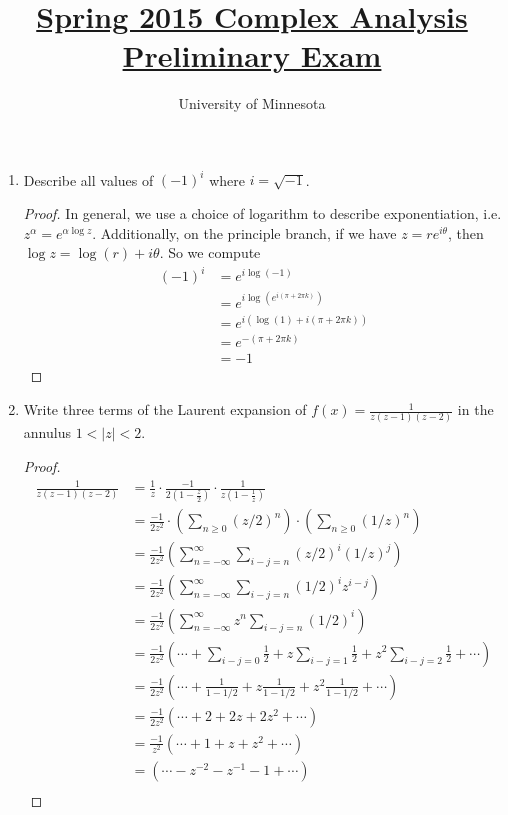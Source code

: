 \documentclass{article}
\title{\href{https://math.umn.edu/sites/math.umn.edu/files/exams/complexs15.pdf}{Spring 2015 Complex Analysis Preliminary Exam}}
\author{University of Minnesota}
\date{}
\begin{document}
\maketitle

\begin{enumerate}
	
	\item Describe all values of $(-1)^i$ where $i = \sqrt{-1}$.
	
	\begin{proof}
		In general, we use a choice of logarithm to describe exponentiation, i.e. $z^\alpha = e^{\alpha \log z}$.
		Additionally, on the principle branch, if we have $z = re^{i \theta}$, then $\log z = \log(r) + i\theta$.
		So we compute
		\begin{align*}
			(-1)^i &= e^{i \log (-1)} \\
			&= e^{i \log(e^{i (\pi + 2\pi k)})}\\
			&= e^{i (\log(1) + i (\pi + 2\pi k))}\\
			&= e^{-(\pi+2\pi k)}\\
			&= -1
		\end{align*}
	\end{proof}
	
	\item Write three terms of the Laurent expansion of $f(x) = \frac{1}{z(z-1)(z-2)}$ in the annulus $1 < |z| < 2$.
	
	\begin{proof}
	\begin{align*}
		\frac{1}{z(z-1)(z-2)}&= \frac{1}{z} \cdot \frac{-1}{2(1-\frac{z}{2})} \cdot \frac{1}{z(1-\frac{1}{z})}\\
		&= \frac{-1}{2z^2} \cdot \left ( \sum_{n \geq 0} (z/2)^n \right ) \cdot \left ( \sum_{n\geq 0} (1/z)^n \right )\\
		&= \frac{-1}{2z^2} \left ( \sum_{n = - \infty}^\infty  \sum_{i - j = n} (z/2)^i(1/z)^j \right ) \\
		&= \frac{-1}{2z^2} \left ( \sum_{n = - \infty}^\infty  \sum_{i - j = n} (1/2)^i z^{i-j} \right ) \\
		&= \frac{-1}{2z^2} \left ( \sum_{n = - \infty}^\infty  z^n \sum_{i - j = n} (1/2)^i\right ) \\
		&= \frac{-1}{2z^2} \left ( \cdots + \sum_{i-j = 0} \frac{1}{2} + z \sum_{i-j = 1} \frac{1}{2}+ z^2\sum_{i-j = 2} \frac{1}{2}+\cdots  \right )\\
		&= \frac{-1}{2z^2} \left ( \cdots + \frac{1}{1-1/2} + z \frac{1}{1-1/2} + z^2 \frac{1}{1-1/2}+\cdots  \right )\\
		&= \frac{-1}{2z^2} \left ( \cdots + 2 + 2z + 2z^2 + \cdots  \right )\\
		&= \frac{-1}{z^2} \left ( \cdots + 1 + z + z^2 + \cdots  \right )\\
		&= \left ( \cdots - z^{-2} - z^{-1} - 1 + \cdots  \right )\\
	\end{align*}
	\end{proof}
	
\end{enumerate}
\end{document}
